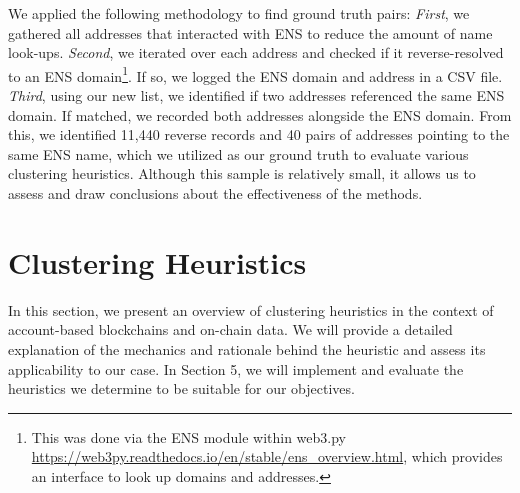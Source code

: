 \documentclass[12pt,a4paper,titlepage,oneside,english]{article}
\begin{document}
We applied the following methodology to find ground truth pairs: \textit{First}, we gathered all addresses that interacted with ENS to reduce the amount of name look-ups. \textit{Second}, we iterated over each address and checked if it reverse-resolved to an ENS domain\footnote{This was done via the ENS module within web3.py \url{https://web3py.readthedocs.io/en/stable/ens_overview.html}, which provides an interface to look up domains and addresses.}. If so, we logged the ENS domain and address in a CSV file. \textit{Third}, using our new list, we identified if two addresses referenced the same ENS domain. If matched, we recorded both addresses alongside the ENS domain. \newline
From this, we identified 11,440 reverse records and 40 pairs of addresses pointing to the same ENS name, which we utilized as our ground truth to evaluate various clustering heuristics. Although this sample is relatively small, it allows us to assess and draw conclusions about the effectiveness of the methods.



\section{Clustering Heuristics}
In this section, we present an overview of clustering heuristics in the context of account-based blockchains and on-chain data. We will provide a detailed explanation of the mechanics and rationale behind the heuristic and assess its applicability to our case. 
In Section 5, we will implement and evaluate the heuristics we determine to be suitable for our objectives.
\end{document}
